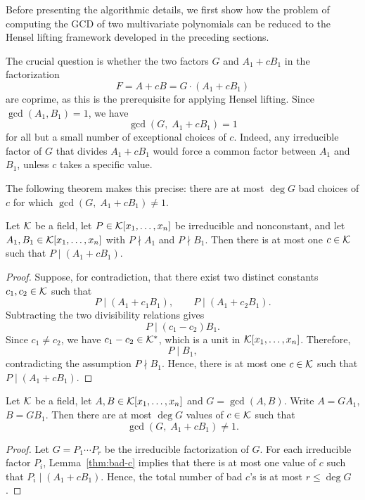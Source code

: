 \documentclass{article}
\numberwithin{equation}{section}
\begin{document}
Before presenting the algorithmic details, we first show how the problem of computing the GCD of two multivariate polynomials can be reduced to the Hensel lifting framework developed in the preceding sections.


The crucial question is whether the two factors $G$ and $A_1+cB_1$ in the factorization
\[
F = A + cB = G \cdot (A_1 + c B_1)
\]
are coprime, as this is the prerequisite for applying Hensel lifting.
%
Since $\gcd(A_1, B_1) = 1$, we have
\[
\gcd(G,\; A_1 + c B_1) = 1
\]
for all but a small number of exceptional choices of $c$. Indeed, any irreducible factor of $G$ that divides $A_1 + cB_1$ would force a common factor between $A_1$ and $B_1$, unless $c$ takes a specific value.

The following theorem makes this precise: there are at most $\deg G$ bad choices of $c$ for which $\gcd(G,\; A_1 + cB_1) \neq 1$.




\begin{lemma}\label{thm:bad-c}
Let ${\mathcal{K}}$ be a field, let $P \in {\mathcal{K}}[x_1, \dots, x_n]$ be irreducible and nonconstant, and let $A_1, B_1 \in {\mathcal{K}}[x_1, \dots, x_n]$ with $P \nmid A_1$ and $P \nmid B_1$. Then there is at most one $c \in {\mathcal{K}}$ such that $P \mid (A_1 + c B_1)$.
\end{lemma}

\begin{proof}
Suppose, for contradiction, that there exist two distinct constants $c_1, c_2 \in {\mathcal{K}}$ such that
\[
P \mid (A_1 + c_1 B_1), \qquad P \mid (A_1 + c_2 B_1).
\]
Subtracting the two divisibility relations gives
\[
P \mid (c_1 - c_2) B_1.
\]
Since $c_1 \neq c_2$, we have $c_1 - c_2 \in {\mathcal{K}}^*$, which is a unit in ${\mathcal{K}}[x_1, \dots, x_n]$. Therefore,
\[
P \mid B_1,
\]
contradicting the assumption $P \nmid B_1$. Hence, there is at most one $c \in {\mathcal{K}}$ such that $P \mid (A_1 + c B_1)$.
\end{proof}

\begin{theorem}\label{thm:good-c}
Let ${\mathcal{K}}$ be a field, let $A, B \in {\mathcal{K}}[x_1, \dots, x_n]$ and $G = \gcd(A, B)$. Write $A = G A_1$, $B = G B_1$. Then there are at most $\deg G$ values of $c \in {\mathcal{K}}$ such that
\[
\gcd(G,\; A_1 + c B_1) \neq 1.
\]

\end{theorem}

\begin{proof}
Let $G = P_1 \cdots P_r$ be the irreducible factorization of $G$. For each irreducible factor $P_i$, Lemma~\ref{thm:bad-c} implies that there is at most one value of $c$ such that $P_i \mid (A_1 + c B_1)$. Hence, the total number of bad $c$'s is at most $r \le \deg G$.
\end{proof}
\end{document}
